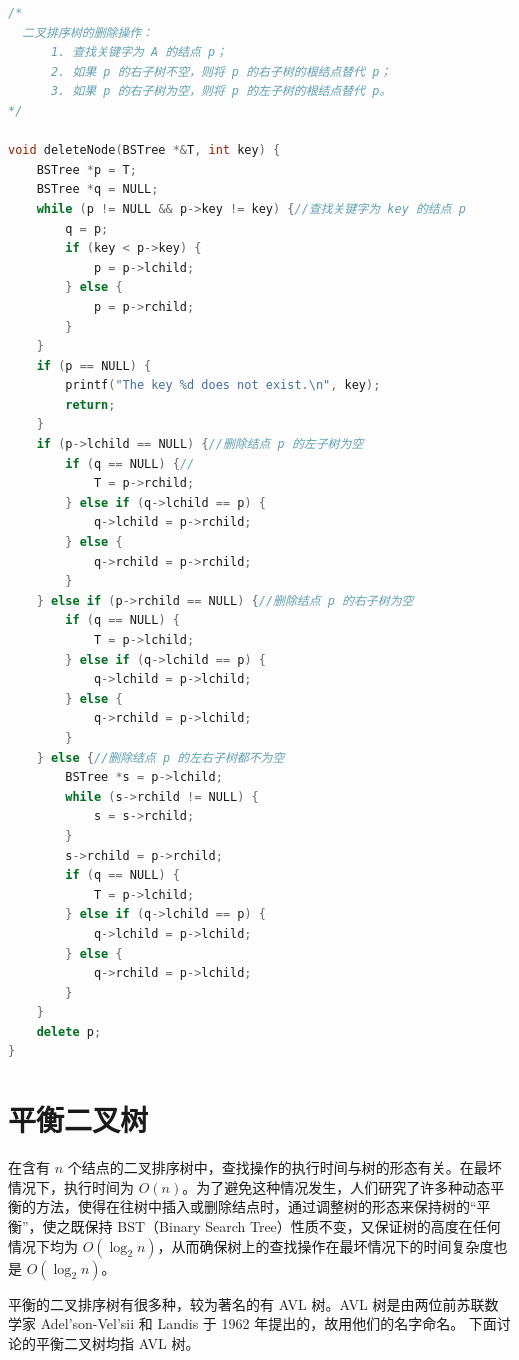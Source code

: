 \documentclass[lang=cn,newtx,10pt,scheme=chinese]{elegantbook}
\begin{document}
\begin{lstlisting}[language=C++, caption={二叉排序树的删除操作}]
  /*
  二叉排序树的删除操作：
      1. 查找关键字为 A 的结点 p；
      2. 如果 p 的右子树不空，则将 p 的右子树的根结点替代 p；
      3. 如果 p 的右子树为空，则将 p 的左子树的根结点替代 p。
*/

void deleteNode(BSTree *&T, int key) {
    BSTree *p = T;
    BSTree *q = NULL;
    while (p != NULL && p->key != key) {//查找关键字为 key 的结点 p
        q = p;
        if (key < p->key) {
            p = p->lchild;
        } else {
            p = p->rchild;
        }
    }
    if (p == NULL) {
        printf("The key %d does not exist.\n", key);
        return;
    }
    if (p->lchild == NULL) {//删除结点 p 的左子树为空
        if (q == NULL) {//
            T = p->rchild;
        } else if (q->lchild == p) {
            q->lchild = p->rchild;
        } else {
            q->rchild = p->rchild;
        }
    } else if (p->rchild == NULL) {//删除结点 p 的右子树为空
        if (q == NULL) {
            T = p->lchild;
        } else if (q->lchild == p) {
            q->lchild = p->lchild;
        } else {
            q->rchild = p->lchild;
        }
    } else {//删除结点 p 的左右子树都不为空
        BSTree *s = p->lchild;
        while (s->rchild != NULL) {
            s = s->rchild;
        }
        s->rchild = p->rchild;
        if (q == NULL) {
            T = p->lchild;
        } else if (q->lchild == p) {
            q->lchild = p->lchild;
        } else {
            q->rchild = p->lchild;
        }
    }
    delete p;
}
\end{lstlisting}






\section{平衡二叉树}

在含有 $n$ 个结点的二叉排序树中，查找操作的执行时间与树的形态有关。在最坏情况下，执行时间为 $O(n)$。为了避免这种情况发生，人们研究了许多种动态平衡的方法，使得在往树中插入或删除结点时，通过调整树的形态来保持树的“平衡”，使之既保持 BST（Binary Search Tree）性质不变，又保证树的高度在任何情况下均为 $O(\log_2 n)$，从而确保树上的查找操作在最坏情况下的时间复杂度也是 $O(\log_2 n)$。

平衡的二叉排序树有很多种，较为著名的有 AVL 树。AVL 树是由两位前苏联数学家 Adel'son-Vel'sii 和 Landis 于 1962 年提出的，故用他们的名字命名。
下面讨论的平衡二叉树均指 AVL 树。
\end{document}
